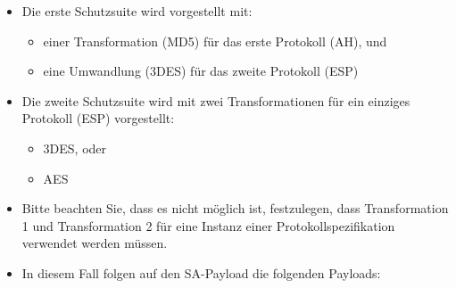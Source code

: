 \documentclass[a4paper]{article}
\begin{document}
\begin{multicols}{3}
\begin{itemize}
              \begin{itemize}
                  \item
                        Die erste Schutzsuite wird vorgestellt mit:

                        \begin{itemize}
                            \item
                                  einer Transformation (MD5) für das erste Protokoll (AH), und
                            \item
                                  eine Umwandlung (3DES) für das zweite Protokoll (ESP)
                        \end{itemize}
                  \item
                        Die zweite Schutzsuite wird mit zwei Transformationen für ein
                        einziges Protokoll (ESP) vorgestellt:

                        \begin{itemize}
                            \item
                                  3DES, oder
                            \item
                                  AES
                        \end{itemize}
                  \item
                        Bitte beachten Sie, dass es nicht möglich ist, festzulegen, dass
                        Transformation 1 und Transformation 2 für eine Instanz einer
                        Protokollspezifikation verwendet werden müssen.
                  \item
                        In diesem Fall folgen auf den SA-Payload die folgenden Payloads:


\end{itemize}
\end{itemize}
\end{multicols}
\end{document}
